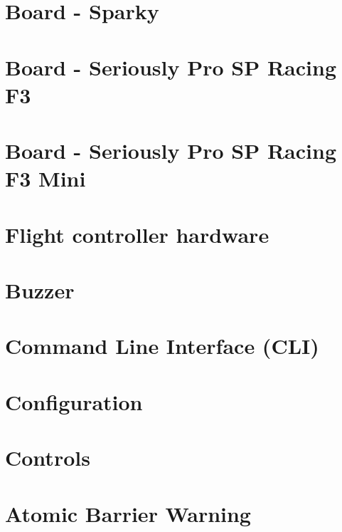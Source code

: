 \documentclass[twoside]{book}
\newcommand{\+}{\discretionary{\mbox{\scriptsize$\hookleftarrow$}}{}{}}
\begin{document}
\chapter{Board -\/ Sparky}
\label{md_docs_Board_-_Sparky}
\hypertarget{md_docs_Board_-_Sparky}{}

\chapter{Board -\/ Seriously Pro S\+P Racing F3}
\label{md_docs_Board_-_SPRacingF3}
\hypertarget{md_docs_Board_-_SPRacingF3}{}

\chapter{Board -\/ Seriously Pro S\+P Racing F3 Mini}
\label{md_docs_Board_-_SPRacingF3Mini}
\hypertarget{md_docs_Board_-_SPRacingF3Mini}{}

\chapter{Flight controller hardware}
\label{md_docs_Boards}
\hypertarget{md_docs_Boards}{}

\chapter{Buzzer}
\label{md_docs_Buzzer}
\hypertarget{md_docs_Buzzer}{}

\chapter{Command Line Interface (C\+L\+I)}
\label{md_docs_Cli}
\hypertarget{md_docs_Cli}{}

\chapter{Configuration}
\label{md_docs_Configuration}
\hypertarget{md_docs_Configuration}{}

\chapter{Controls}
\label{md_docs_Controls}
\hypertarget{md_docs_Controls}{}

\chapter{Atomic Barrier Warning}
\label{md_docs_development_Atomic_Barrier}
\hypertarget{md_docs_development_Atomic_Barrier}{}

\end{document}
